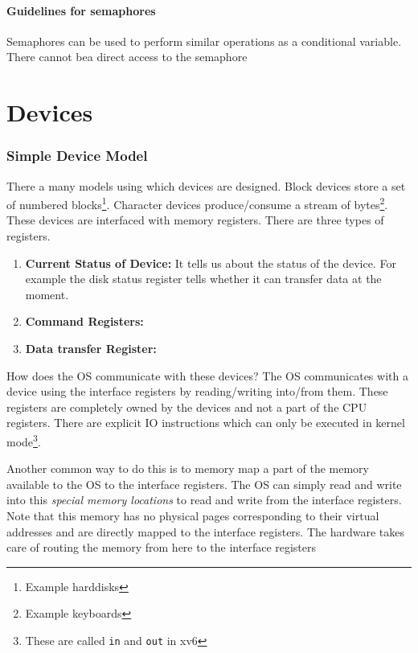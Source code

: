 \documentclass[12pt]{article}
\begin{document}
\subsection{Guidelines for semaphores}
Semaphores can be used to perform similar operations as a conditional variable. There cannot bea direct access to the semaphore




\newpage
\part{Devices}



\section{Simple Device Model}

There a many models using which devices are designed. Block devices store a set of numbered blocks\footnote{Example harddisks}. Character devices produce/consume a stream of bytes\footnote{Example keyboards}.
These devices are interfaced with memory registers. There are three types of registers.\
\begin{enumerate}
    \item \textbf{Current Status of Device:} It tells us about the status of the device. For example the disk status register tells whether it can transfer data at the moment.
    \item \textbf{Command Registers:}
    \item \textbf{Data transfer Register:}
\end{enumerate} 

How does the OS communicate with these devices? The OS communicates with a device using the interface registers by reading/writing into/from them. These
registers are completely owned by the devices and not a part of the CPU registers. 
There are explicit IO instructions which can only be executed in kernel mode\footnote{These are called \texttt{in} and \texttt{out} in xv6 }.

Another common way to do this is 
to memory map a part of the memory available to the OS to the interface registers. The OS can simply read and write into this \textit{special memory locations} to read and write from 
the interface registers. Note that this memory has no physical pages corresponding to their virtual addresses and are directly mapped to the interface registers. The hardware takes care of routing the 
memory from here to the interface registers 
\end{document}
